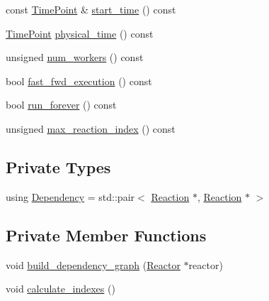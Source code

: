 \begin{DoxyCompactItemize}
\item 
const \hyperlink{namespacereactor_ad950f8d1a46612500286a4af0f167080}{Time\+Point} \& \hyperlink{classreactor_1_1Environment_af7643c6bf796bd083ff4976af19e8838}{start\+\_\+time} () const
\item 
\hyperlink{namespacereactor_ad950f8d1a46612500286a4af0f167080}{Time\+Point} \hyperlink{classreactor_1_1Environment_aaf28ead7b6e2a273f000f71524d81a11}{physical\+\_\+time} () const
\item 
unsigned \hyperlink{classreactor_1_1Environment_a3348b53c1d45a315920832d7505f9057}{num\+\_\+workers} () const
\item 
bool \hyperlink{classreactor_1_1Environment_a4f6e899d401fc1238143de9d725c247d}{fast\+\_\+fwd\+\_\+execution} () const
\item 
bool \hyperlink{classreactor_1_1Environment_a7a83a769b141d23297912e7588eb4495}{run\+\_\+forever} () const
\item 
unsigned \hyperlink{classreactor_1_1Environment_a2d50de0d09d5aa56a9876441233590f0}{max\+\_\+reaction\+\_\+index} () const
\end{DoxyCompactItemize}
\subsection*{Private Types}
\begin{DoxyCompactItemize}
\item 
using \hyperlink{classreactor_1_1Environment_aefeb24b3f7a321c7dc8309cac1ed176d}{Dependency} = std\+::pair$<$ \hyperlink{classreactor_1_1Reaction}{Reaction} $\ast$, \hyperlink{classreactor_1_1Reaction}{Reaction} $\ast$ $>$
\end{DoxyCompactItemize}
\subsection*{Private Member Functions}
\begin{DoxyCompactItemize}
\item 
void \hyperlink{classreactor_1_1Environment_a25e3210c41ddd193223c63adc454358a}{build\+\_\+dependency\+\_\+graph} (\hyperlink{classreactor_1_1Reactor}{Reactor} $\ast$reactor)
\item 
void \hyperlink{classreactor_1_1Environment_a8b832858f8c20d36ffc8331ef9f9ac14}{calculate\+\_\+indexes} ()
\end{DoxyCompactItemize}
